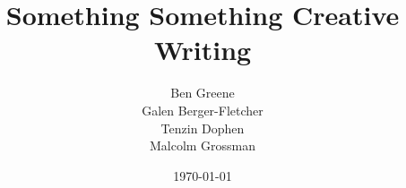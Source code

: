 \documentclass{article}
\title{Something Something Creative Writing}
\author{Ben Greene\\Galen Berger-Fletcher\\Tenzin Dophen\\Malcolm Grossman}
\date{\today}
\begin{document}
\maketitle















\nocite*{}


\end{document}
